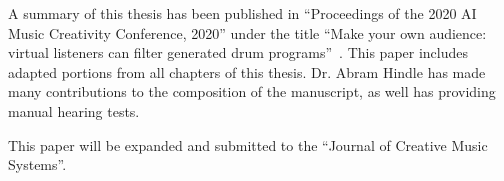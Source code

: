\documentclass[\main/thesis.tex]{subfiles}
\begin{document}
\begin{preface}
A summary of this thesis has been published in \enquote{Proceedings of the 2020 AI Music Creativity Conference, 2020} under the title \enquote{Make your own audience: virtual listeners can filter generated drum programs}~\cite{salimiCSMC2020-virtual-listeners-drums}. This paper includes adapted portions from all chapters of this thesis.  Dr. Abram Hindle has made many contributions to the composition of the manuscript, as well has providing manual hearing tests.

This paper will be expanded and submitted to the \enquote{Journal of Creative Music Systems}. \\

\end{preface}
\end{document}
